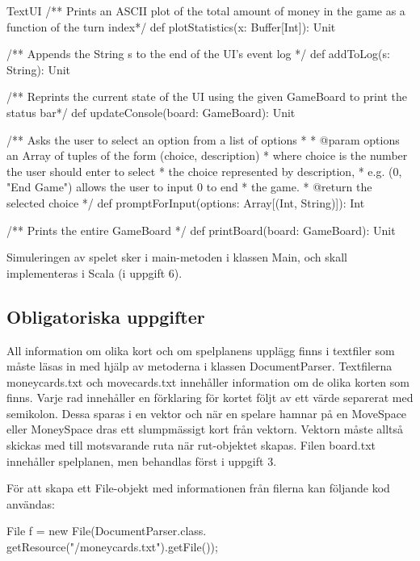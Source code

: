 \begin{ScalaSpec}{TextUI}
   /** Prints an ASCII plot of the total amount 
	of money in the game as a function of the turn index*/
  def plotStatistics(x: Buffer[Int]): Unit

  /** Appends the String s to the end of the UI's event log */
  def addToLog(s: String): Unit 

  /** Reprints the current state of the UI using the given
	GameBoard to print the status bar*/
  def updateConsole(board: GameBoard): Unit 

 
  /** Asks the user to select an option from a list of options
    *
    * @param options an Array of tuples of the form (choice, description)
    *                where choice is the number the user should enter to select 
    *                the choice represented by description,
    *                e.g. (0,  "End Game") allows the user to input 0 to end 
    *                the game.
    * @return        the selected choice
    */
  def promptForInput(options: Array[(Int, String)]): Int 

  /** Prints the entire GameBoard */
  def printBoard(board: GameBoard): Unit 

 
\end{ScalaSpec}

Simuleringen av spelet sker i main-metoden i klassen Main, och skall implementeras i Scala (i uppgift 6).


\subsection{Obligatoriska uppgifter}

\Task All information om olika kort och om spelplanens upplägg finns i textfiler som måste läsas in med hjälp av metoderna i klassen DocumentParser. 
Textfilerna moneycards.txt och movecards.txt innehåller information om de olika korten som finns.
Varje rad innehåller en förklaring för kortet följt av ett värde separerat med semikolon. Dessa sparas i en vektor och när en spelare hamnar på en MoveSpace eller MoneySpace dras ett slumpmässigt kort från vektorn. Vektorn måste alltså skickas med till motsvarande ruta när rut-objektet skapas.
Filen board.txt innehåller spelplanen, men behandlas först i uppgift 3.

För att skapa ett File-objekt med informationen från filerna kan följande kod användas:
\newline
\newline
\begin{Code}
File f = new File(DocumentParser.class.
        getResource("/moneycards.txt").getFile());
\end{Code}

